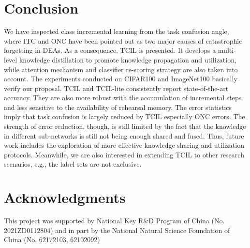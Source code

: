 \documentclass[letterpaper]{article} %
\begin{document}
\section{Conclusion}
We have inspected class incremental learning from the task confusion angle, where ITC and ONC have been pointed out as two major causes of catastrophic forgetting in DEAs. As a consequence, TCIL is presented. It develops a multi-level knowledge distillation to promote knowledge propagation and utilization, while attention mechanism and classifier re-scoring strategy are also taken into account. The experiments conducted on CIFAR100 and ImageNet100 basically verify our proposal. TCIL and TCIL-lite consistently report state-of-the-art accuracy. They are also more robust with the accumulation of incremental steps and less sensitive to the availability of rehearsal memory. The error statistics imply that task confusion is largely reduced by TCIL especially ONC errors. The strength of error reduction, though, is still limited by the fact that the knowledge in different sub-networks is still not being enough shared and fused. Thus, future work includes the exploration of more effective knowledge sharing and utilization protocols. Meanwhile, we are also interested in extending TCIL to other research scenarios, e.g., the label sets are not exclusive.

\section{Acknowledgments}
This project was supported by National Key R\&D Program of China (No. 2021ZD0112804) and in part by the National Natural Science Foundation of China (No. 62172103,  62102092)
\end{document}
